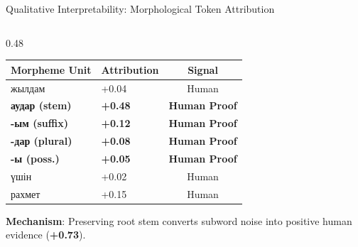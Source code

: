 \documentclass[aspectratio=169, 10pt]{beamer}
\begin{document}
\begin{frame}{Qualitative Interpretability: Morphological Token Attribution}
\begin{columns}[T]
\begin{column}{0.48\textwidth}
            {\footnotesize\setlength{\tabcolsep}{3pt}
            \begin{tabular*}{\linewidth}{@{\extracolsep{\fill}}llc}
                \toprule
                \textbf{Morpheme Unit} & \textbf{Attribution} & \textbf{Signal} \\
                \midrule
                жылдам & +0.04 & Human \\
                \rowcolor{green!10} \textbf{аудар (stem)} & \textbf{+0.48} & \textbf{Human Proof} \\
                \rowcolor{green!10} \textbf{-ым (suffix)} & \textbf{+0.12} & \textbf{Human Proof} \\
                \rowcolor{green!10} \textbf{-дар (plural)} & \textbf{+0.08} & \textbf{Human Proof} \\
                \rowcolor{green!10} \textbf{-ы (poss.)} & \textbf{+0.05} & \textbf{Human Proof} \\
                үшін & +0.02 & Human \\
                рахмет & +0.15 & Human \\
                \bottomrule
            \end{tabular*}}
            \vspace{3pt}
            {\scriptsize\color{SlateText}\textbf{Mechanism}: Preserving root stem converts subword noise into positive human evidence (\textbf{+0.73}).\par}
        \end{column}
    \end{columns}
\end{frame}
\end{document}
